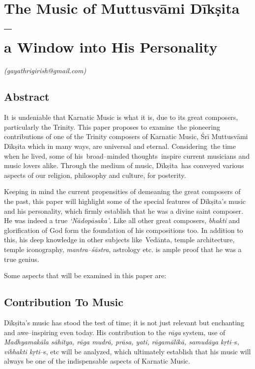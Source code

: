 
\chapter{The Music of Muttusvāmi Dīkṣita –\\ a Window into His Personality}\label{chapter1}


\begin{flushright}
\textit{(gayathrigirish@gmail.com)}
\end{flushright}


\section*{Abstract}

It is undeniable that Karnatic Music is what it is, due to its great composers, particularly the Trinity. This paper proposes to examine the pioneering contributions of one of the Trinity composers of Karnatic Music, Śrī Muttusvāmi Dīkṣita which in many ways, are universal and eternal. Considering the time when he lived, some of his broad–minded thoughts inspire current musicians and music lovers alike. Through the medium of music, Dīkṣita has conveyed various aspects of our religion, philosophy and culture, for posterity.

Keeping in mind the current propensities of demeaning the great composers of the past, this paper will highlight some of the special features of Dīkṣita’s music and his personality, which firmly establish that he was a divine saint composer. He was indeed a true \textit{‘Nādopāsaka’}. Like all other great composers, \textit{bhakti} and glorification of God form the foundation of his compositions too. In addition to this, his deep knowledge in other subjects like Vedānta, temple architecture, temple iconography, \textit{mantra–śāstra}, astrology etc. is ample proof that he was a true genius. 

Some aspects that will be examined in this paper are:


\section*{Contribution To Music}

Dīkṣita’s music has stood the test of time; it is not just relevant but enchanting and awe–inspiring even today. His contribution to the \textit{rāga} system, use of \textit{Madhyamakāla sāhitya, rāga mudrā, prāsa, yati, rāgamālikā, samudāya} \textit{kṛti}–s, \textit{vibhakti kṛti}–s, etc will be analyzed, which ultimately establish that his music will always be one of the indispensable aspects of Karnatic Music.


